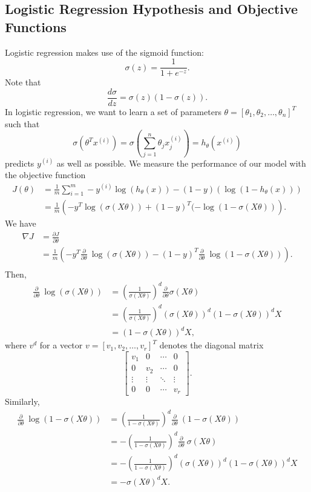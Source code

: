 \documentclass{article}
\begin{document}
\subsection{Logistic Regression Hypothesis and Objective Functions}
Logistic regression makes use of the sigmoid function: 
$$\sigma(z) = \frac{1}{1 + e^{-z}}.$$
Note that
$$\frac{d\sigma}{dz} = \sigma(z)(1 - \sigma(z)).$$
In logistic regression, we want to learn a set of parameters $\theta = [\theta_1, \theta_2, \dots, \theta_n]^T$ such that
$$\sigma(\theta^T x^{(i)}) = \sigma\left(\sum_{j = 1}^{n} \theta_j x_j^{(i)} \right) = h_\theta(x^{(i)})$$
predicts $y^{(i)}$ as well as possible. We measure the performance of our model with the objective function
\begin{align*}
J(\theta) &= \frac{1}{m}\sum_{i=1}^{m} -y^{(i)}\log(h_\theta(x)) - (1-y)(\log(1 - h_\theta(x)))\\
&= \frac{1}{m}\left(-y^T\log(\sigma(X\theta)) + (1-y)^T(-\log(1-\sigma(X\theta))\right).
\end{align*}
We have
\begin{align*}
\nabla J &= \frac{\partial J}{\partial \theta} \\
&= \frac{1}{m} \left(-y^T\frac{\partial}{\partial \theta}~ \log(\sigma(X\theta)) - (1-y)^T\frac{\partial}{\partial \theta}~\log(1-\sigma(X\theta))\right). \\
\end{align*}
Then,
\begin{align*}
\frac{\partial}{\partial \theta}~ \log(\sigma(X\theta)) &= \left(\frac{1}{\sigma(X\theta)}\right)^d \frac{\partial}{\partial \theta} \sigma(X\theta)\\
&= \left(\frac{1}{\sigma(X\theta)}\right)^d (\sigma(X\theta))^d(1 - \sigma(X\theta))^dX\\
&= (1 - \sigma(X\theta))^dX,
\end{align*}
where $v^d$ for a vector $v = [v_1, v_2, \dots, v_r]^T$ denotes the diagonal matrix
$$\left[\begin{array}{cccc}
v_1 & 0 & \cdots & 0\\
0 & v_2 & \cdots & 0\\
\vdots & \vdots & \ddots & \vdots\\
0 & 0 & \cdots & v_r\end{array}\right].
$$
Similarly,
\begin{align*}
\frac{\partial}{\partial \theta}~\log(1-\sigma(X\theta)) &= \left(\frac{1}{1-\sigma(X\theta)}\right)^d \frac{\partial}{\partial \theta}~(1 - \sigma(X\theta))\\
&= -\left(\frac{1}{1-\sigma(X\theta)}\right)^d\frac{\partial}{\partial \theta}~ \sigma(X\theta)\\
&= -\left(\frac{1}{1-\sigma(X\theta)}\right)^d(\sigma(X\theta))^d(1 - \sigma(X\theta))^dX\\
&= -\sigma(X\theta)^dX.
\end{align*}
\end{document}

